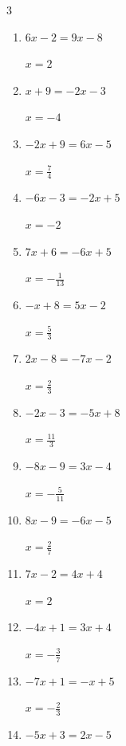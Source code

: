 \begin{multicols}{3}
\begin{enumerate}
        $\displaystyle x=-\frac{16}{13}$

  \item $6x-2=9x-8$

        $\displaystyle x=2$

  \item $x+9=-2x-3$

        $\displaystyle x=-4$

  \item $-2x+9=6x-5$

        $\displaystyle x=\frac{7}{4}$

  \item $-6x-3=-2x+5$

        $\displaystyle x=-2$

  \item $7x+6=-6x+5$

        $\displaystyle x=-\frac{1}{13}$

  \item $-x+8=5x-2$

        $\displaystyle x=\frac{5}{3}$

\columnbreak %

\resetques

  \item $2x-8=-7x-2$

        $\displaystyle x=\frac{2}{3}$

  \item $-2x-3=-5x+8$

        $\displaystyle x=\frac{11}{3}$

  \item $-8x-9=3x-4$

        $\displaystyle x=-\frac{5}{11}$

  \item $8x-9=-6x-5$

        $\displaystyle x=\frac{2}{7}$

  \item $7x-2=4x+4$

        $\displaystyle x=2$

  \item $-4x+1=3x+4$

        $\displaystyle x=-\frac{3}{7}$

  \item $-7x+1=-x+5$

        $\displaystyle x=-\frac{2}{3}$

  \item $-5x+3=2x-5$


\end{enumerate}
\end{multicols}
